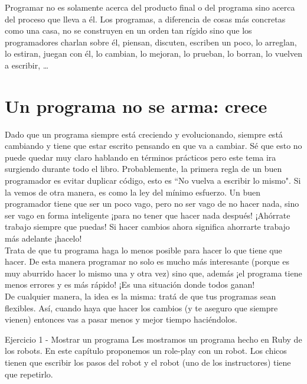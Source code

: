 Programar no es solamente acerca del producto final o del programa sino acerca del proceso que lleva a él. Los programas, a diferencia de cosas más concretas como una casa, no se construyen en un orden tan rígido sino que los programadores charlan sobre él, piensan, discuten, escriben un poco, lo arreglan, lo estiran, juegan con él, lo cambian, lo mejoran, lo prueban, lo borran, lo vuelven a escribir, \ldots

\section{Un programa no se arma: crece}
Dado que un programa siempre está creciendo y evolucionando, siempre está cambiando y tiene que estar escrito pensando en que va a cambiar. Sé que esto no puede quedar muy claro hablando en términos prácticos pero este tema ira surgiendo durante todo el libro. Probablemente, la primera regla de un buen programador es evitar duplicar código, esto es ``No vuelva a escribir lo mismo". Si la vemos de otra manera, es como la ley del mínimo esfuerzo. Un buen programador tiene que ser un poco vago, pero no ser vago de no hacer nada, sino ser vago en forma inteligente ¡para no tener que hacer nada después! ¡Ahórrate trabajo siempre que puedas! Si hacer cambios ahora significa ahorrarte trabajo más adelante ¡hacelo!\\

Trata de que tu programa haga lo menos posible para hacer lo que tiene que hacer. De esta manera programar no solo es mucho más interesante (porque es muy aburrido hacer lo mismo una y otra vez) sino que, además ¡el programa tiene menos errores y es más rápido! ¡Es una situación donde todos ganan!\\

De cualquier manera, la idea es la misma: tratá de que tus programas sean flexibles. Así, cuando haya que hacer los cambios (y te aseguro que siempre vienen) entonces vas a pasar menos y mejor tiempo haciéndolos.

Ejercicio 1 - Mostrar un programa
Les mostramos un programa hecho en Ruby de los robots.
En este capítulo proponemos un role-play con un robot. Los chicos tienen que escribir los pasos del robot y el robot (uno de los instructores) tiene que repetirlo.